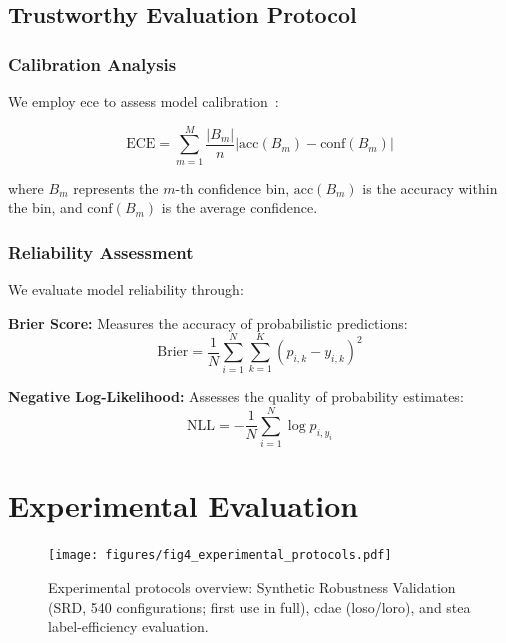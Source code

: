 \documentclass[journal]{IEEEtran}
\begin{document}
\subsection{Trustworthy Evaluation Protocol}

\subsubsection{Calibration Analysis}

We employ \gls{ece} to assess model calibration~\cite{calibration_guo2017}:

\begin{equation}
\text{ECE} = \sum_{m=1}^{M} \frac{|B_m|}{n} |\text{acc}(B_m) - \text{conf}(B_m)|
\end{equation}

where $B_m$ represents the $m$-th confidence bin, $\text{acc}(B_m)$ is the accuracy within the bin, and $\text{conf}(B_m)$ is the average confidence.

\subsubsection{Reliability Assessment}

We evaluate model reliability through:

\textbf{Brier Score:} Measures the accuracy of probabilistic predictions:
\begin{equation}
\text{Brier} = \frac{1}{N} \sum_{i=1}^{N} \sum_{k=1}^{K} (p_{i,k} - y_{i,k})^2
\end{equation}

\textbf{Negative Log-Likelihood:} Assesses the quality of probability estimates:
\begin{equation}
\text{NLL} = -\frac{1}{N} \sum_{i=1}^{N} \log p_{i,y_i}
\end{equation}

\section{Experimental Evaluation}

\begin{figure}[t]
\centering
\texttt{[image: figures/fig4\_experimental\_protocols.pdf]}
\caption{Experimental protocols overview: Synthetic Robustness Validation (SRD, 540 configurations; first use in full), \gls{cdae} (\gls{loso}/\gls{loro}), and \gls{stea} label-efficiency evaluation.}
\label{fig:protocols}
\end{figure}
\end{document}
